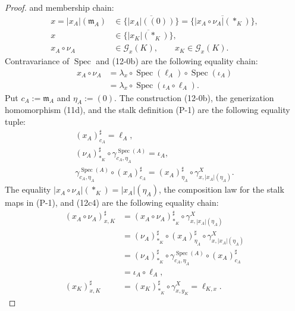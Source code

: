 \begin{proof}
  and membership chain:
  \[
  \begin{aligned}
    x=|x_A|(\mathfrak m_A)
      &\in\overline{\{|x_A|((0))\}}
       =\overline{\{|x_A\circ\nu_A|(\ast_K)\}},\\
    x&\in\overline{\{|x_K|(\ast_K)\}},\\
    x_A\circ\nu_A&\in\mathscr G_x(K),
    \qquad x_K\in\mathscr G_x(K).
  \end{aligned}                                                    \tag{12c2}
  \]
  Contravariance of $\operatorname{Spec}$ and (12-0b) are the following
  equality chain:
  \[
  \begin{aligned}
    x_A\circ\nu_A
      &=\lambda_x\circ\operatorname{Spec}(\ell_A)
          \circ\operatorname{Spec}(\iota_A)\\
      &=\lambda_x\circ\operatorname{Spec}(\iota_A\circ\ell_A).
  \end{aligned}                                                    \tag{12c3}
  \]
  Put $c_A:=\mathfrak m_A$ and $\eta_A:=(0)$.  The construction (12-0b),
  the generization homomorphism (11d), and the stalk definition (P-1) are the
  following equality tuple:
  \[
  \begin{gathered}
    (x_A)_{c_A}^\sharp=\ell_A,\\
    (\nu_A)_{\ast_K}^\sharp\circ
      \gamma^{\operatorname{Spec}(A)}_{c_A,\eta_A}=\iota_A,\\
    \gamma^{\operatorname{Spec}(A)}_{c_A,\eta_A}
      \circ(x_A)_{c_A}^\sharp
      =(x_A)_{\eta_A}^\sharp\circ
        \gamma^X_{x,|x_A|(\eta_A)}.
  \end{gathered}                                                   \tag{12c4}
  \]
  The equality $|x_A\circ\nu_A|(\ast_K)=|x_A|(\eta_A)$, the composition
  law for the stalk maps in (P-1), and (12c4) are the following equality
  chain:
  \[
  \begin{aligned}
    (x_A\circ\nu_A)_{x,K}^\sharp
      &=(x_A\circ\nu_A)_{\ast_K}^\sharp\circ
        \gamma^X_{x,|x_A|(\eta_A)}\\
      &=(\nu_A)_{\ast_K}^\sharp\circ(x_A)_{\eta_A}^\sharp
          \circ\gamma^X_{x,|x_A|(\eta_A)}\\
      &=(\nu_A)_{\ast_K}^\sharp\circ
          \gamma^{\operatorname{Spec}(A)}_{c_A,\eta_A}
          \circ(x_A)_{c_A}^\sharp\\
      &=\iota_A\circ\ell_A,\\
    (x_K)_{x,K}^\sharp
      &=(x_K)_{\ast_K}^\sharp\circ\gamma^X_{x,y_K}
       =\ell_{K,x}.
  \end{aligned}                                                    \tag{12c4a}
\]
\end{proof}
